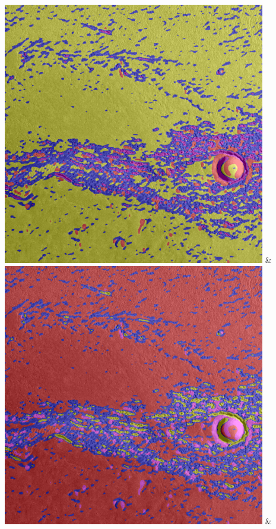 \begin{table}[h!]
\begin{tabularx}{\textwidth}
		\includegraphics[width=0.9\linewidth]{images/gen/color_weight/p03_02.png_0.00.png} &
		\includegraphics[width=0.9\linewidth]{images/gen/color_weight/p03_02.png_0.33.png} &

\end{tabularx}
\end{table}

